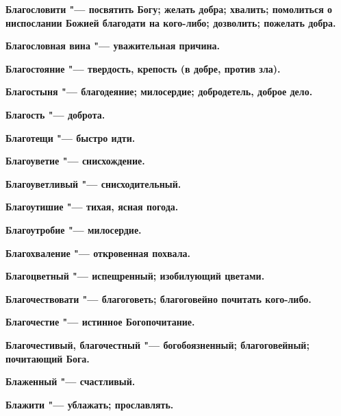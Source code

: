 \bfseries Благословити \normalfont{} "--- посвятить Богу; желать добра; хвалить; помолиться о ниспослании Божией благодати на кого-либо; дозволить; пожелать добра. 




\bfseries Благословная вина \normalfont{} "--- уважительная причина. 




\bfseries Благостояние \normalfont{} "--- твердость, крепость (в добре, против зла). 




\bfseries Благостыня \normalfont{} "--- благодеяние; милосердие; добродетель, доброе дело. 




\bfseries Благость \normalfont{} "--- доброта. 




\bfseries Благотещи \normalfont{} "--- быстро идти. 




\bfseries Благоуветие \normalfont{} "--- снисхождение. 




\bfseries Благоуветливый \normalfont{} "--- снисходительный. 




\bfseries Благоутишие \normalfont{} "--- тихая, ясная погода. 




\bfseries Благоутробие \normalfont{} "--- милосердие. 




\bfseries Благохваление \normalfont{} "--- откровенная похвала. 




\bfseries Благоцветный \normalfont{} "--- испещренный; изобилующий цветами. 




\bfseries Благочествовати \normalfont{} "--- благоговеть; благоговейно почитать кого-либо. 




\bfseries Благочестие \normalfont{} "--- истинное Богопочитание. 




\bfseries Благочестивый, благочестный \normalfont{} "--- богобоязненный; благоговейный; почитающий Бога. 




\bfseries Блаженный \normalfont{} "--- счастливый. 




\bfseries Блажити \normalfont{} "--- ублажать; прославлять. 




